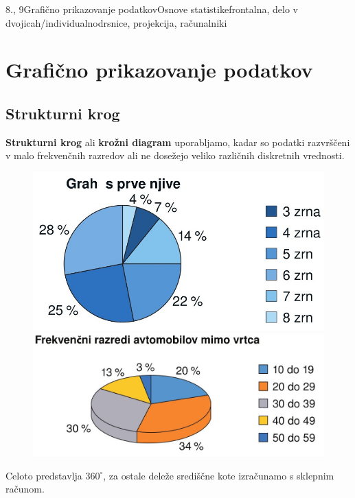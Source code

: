 \begin{priprava}{8., 9}{}{Grafično prikazovanje podatkov}{Osnove statistike}{frontalna, delo v dvojicah/individualno}{drsnice, projekcija, računalniki}

    \section{Grafično prikazovanje podatkov}
                

    \subsection*{Strukturni krog}
    
        \textbf{Strukturni krog} ali \textbf{krožni diagram} uporabljamo, kadar so podatki razvrščeni v malo frekvenčnih razredov 
        ali ne dosežejo veliko različnih diskretnih vrednosti.
    
        \begin{figure}[H]
            \includegraphics[scale=0.3]{../../Slike_in_skice/10921.jpg}
            \includegraphics[scale=0.3]{../../Slike_in_skice/1092.jpg}
        \end{figure}

    
        Celoto predstavlja $360^\circ$, za ostale deleže središčne kote izračunamo s sklepnim računom.
    

\end{priprava}
